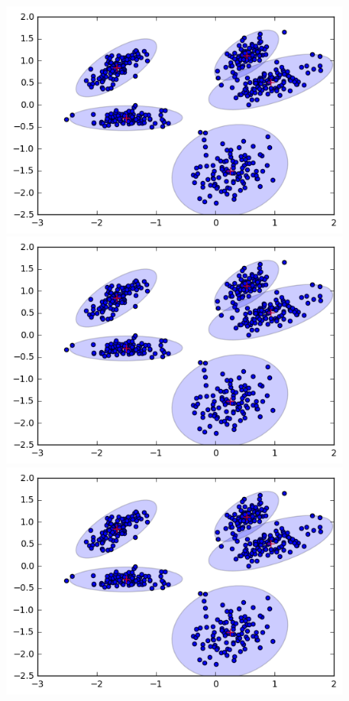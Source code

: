 \documentclass[a4paper,11pt]{article}
\begin{document}
\begin{figure}[htbp]
  \includegraphics[scale=0.17]{em1.png}
  \includegraphics[scale=0.17]{em2.png}
  \includegraphics[scale=0.17]{em3.png}

\end{figure}
\end{document}
